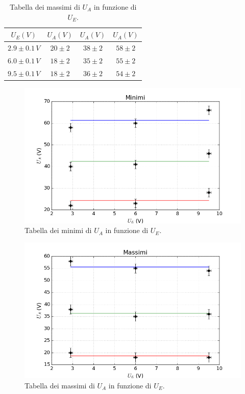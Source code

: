 \documentclass[10pt,a4paper]{article}
\begin{document}
\begin{table}[!htb]
\centering
\begin{tabular}{|c|c|c|c|}
\hline 
$U_E (V)$ & $U_A (V)$ & $U_A (V)$ & $U_A (V)$ \\ 
\hline 
$2.9\pm0.1\,V$ & $20\pm2$ & $38\pm2$ & $58\pm2$ \\ 
\hline 
$6.0\pm0.1\,V$ & $18\pm2$ & $35\pm2$ & $55\pm2$ \\ 
\hline 
$9.5\pm0.1\,V$ & $18\pm2$ & $36\pm2$ & $54\pm2$ \\ 
\hline 
\end{tabular} 
\caption{Tabella dei massimi di $U_A$ in funzione di $U_E$.}
\label{tabellaMassimi}
\end{table}

\begin{figure}[!htb]
  \centering
  \includegraphics[scale=.7]{min.png}
\caption{Tabella dei minimi di $U_A$ in funzione di $U_E$.}
\label{graficoMin}
\end{figure}

\begin{figure}[!htb]
  \centering
  \includegraphics[scale=.7]{max.png}
\caption{Tabella dei massimi di $U_A$ in funzione di $U_E$.}
\label{graficoMax}
\end{figure}
\end{document}
